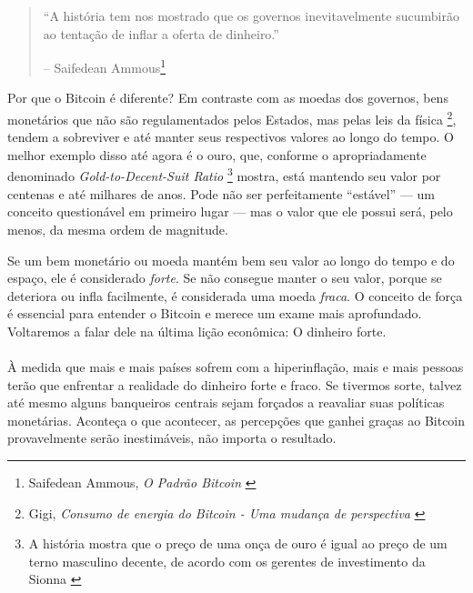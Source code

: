\begin{quotation}\begin{samepage}
\enquote{A história tem nos mostrado que os governos inevitavelmente sucumbirão ao
tentação de inflar a oferta de dinheiro.}
\begin{flushright} -- Saifedean Ammous\footnote{Saifedean Ammous, \textit{O Padrão Bitcoin} \cite{bitcoin-standard}}
\end{flushright}\end{samepage}\end{quotation}

\newpage

Por que o Bitcoin é diferente? Em contraste com as moedas dos governos, bens monetários que não são regulamentados pelos Estados, mas pelas leis da física \footnote{Gigi, \textit{Consumo de energia do Bitcoin - Uma mudança de perspectiva} \cite {gigi:energy}}, tendem a sobreviver e até manter seus respectivos valores ao longo do tempo. O melhor exemplo disso até agora é o ouro, que, conforme o apropriadamente denominado \textit{Gold-to-Decent-Suit Ratio} \footnote{A história mostra que o preço de uma onça de ouro é igual ao preço de um terno masculino decente, de acordo com os gerentes de investimento da Sionna \cite{web:gold-to-decent-suite-ratio}} mostra, está mantendo seu valor por centenas e até milhares de anos. Pode não ser perfeitamente \enquote{estável} --- um conceito questionável em primeiro lugar --- mas o valor que ele possui será, pelo menos, da mesma ordem de magnitude.

Se um bem monetário ou moeda mantém bem seu valor ao longo do tempo e do espaço, ele é considerado \textit{forte}. Se não consegue manter o seu valor, porque se deteriora ou infla facilmente, é considerada uma moeda \textit{fraca}. O conceito de força é essencial para entender o Bitcoin e merece um exame mais aprofundado. Voltaremos a falar dele na última lição econômica: O dinheiro forte.

\paragraph{}
À medida que mais e mais países sofrem com a hiperinflação, mais e mais pessoas terão que enfrentar a realidade do dinheiro forte e fraco. Se tivermos sorte, talvez até mesmo alguns banqueiros centrais sejam forçados a reavaliar suas políticas monetárias. Aconteça o que acontecer, as percepções que ganhei graças ao Bitcoin provavelmente serão inestimáveis, não importa o resultado.

